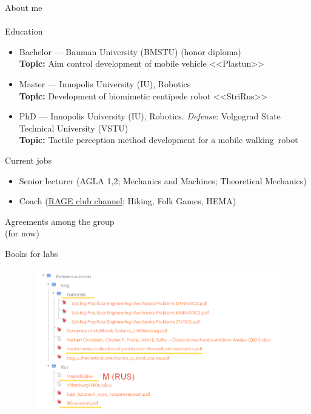 \documentclass[aspectratio=169,xcolor=table,10pt, notes=hide]{beamer}
\newcommand{\fbckg}[1]{\usebackgroundtemplate{\texttt{[image: \#1]}}}%
\begin{document}
\begin{frame}[t]{About me}
    \framesubtitle{}
    \begin{exampleblock}{Education}
        \begin{itemize}
            \item Bachelor --- Bauman University (BMSTU) (honor diploma) \\ \textbf{Topic:} Aim control development of mobile vehicle <<Plastun>>
            \item Master --- Innopolis University (IU), Robotics \\ \textbf{Topic:} Development of biomimetic centipede robot <<StriRus>>
            \item PhD --- Innopolis University (IU), Robotics. \textit{Defense}: Volgograd State Technical University (VSTU)  \\ \textbf{Topic:} Tactile perception method development for a mobile walking~robot
        \end{itemize}
    \end{exampleblock}
    \begin{alertblock}{Current jobs}
        \begin{itemize}
            \item Senior lecturer (AGLA 1,2; Mechanics and Machines; Theoretical Mechanics)
            \item Coach (\href{https://t.me/dich_trainings}{RAGE club channel}: Hiking, Folk Games, HEMA)
        \end{itemize}
    \end{alertblock}
\end{frame}

\fbckg{fibeamer/figs/text_page.png}
\begin{frame}[plain]{}
    \vfill
    \begin{center}
        \huge
        \centering
        Agreements among the group \\
        (for now)
    \end{center}
    \vfill
\end{frame}

\fbckg{fibeamer/figs/common.png}

\begin{frame}[t]{Books for labs}
    \framesubtitle{}
    \begin{figure}[H]
        \centering\includegraphics[height=6cm,width=1\textwidth,keepaspectratio]{image7.png}
    \end{figure}
\end{frame}
\end{document}
